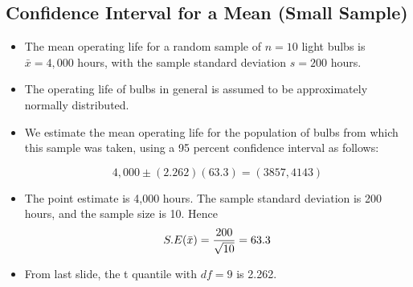 \documentclass[]{report}
\begin{document}
	\subsection{Confidence Interval for a Mean (Small Sample)}
	\begin{itemize}
		\item The mean operating life for a random sample of $n = 10$ light bulbs is $\bar{x} = 4,000$ hours, with the sample
		standard deviation $s = 200$ hours. \item The operating life of bulbs in general is assumed to be approximately normally distributed.\item
		We estimate the mean operating life for the population of bulbs from which this sample was taken, using a 95 percent
		confidence interval as follows:
		
		\[4,000\pm(2.262)(63.3)  = (3857,4143)\]
		
		\item The point estimate is 4,000 hours. The sample standard deviation is 200 hours, and the sample size is 10. Hence \[S.E(\bar{x} ) = { 200 \over \sqrt{10}} = 63.3\]
		
		\item From last slide, the t quantile with $df=9$ is 2.262.
	\end{itemize}
	
	
\end{document}
